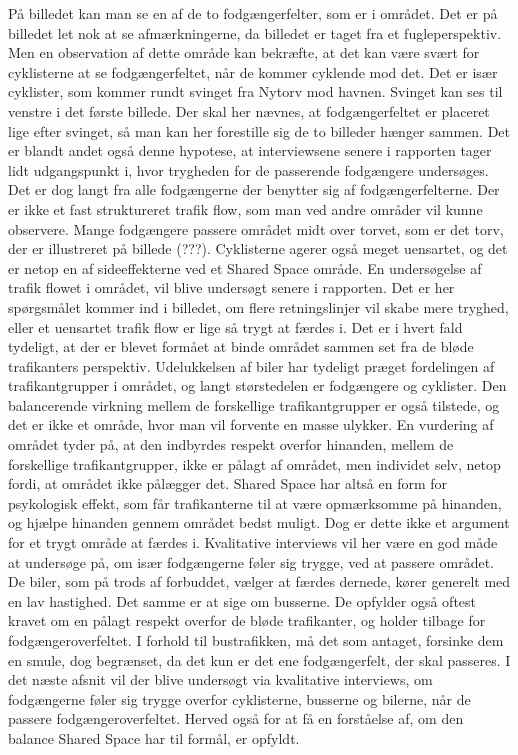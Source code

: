 På billedet kan man se en af de to fodgængerfelter, som er i området. Det er på billedet let nok at se afmærkningerne, da billedet er taget fra et fugleperspektiv. Men en observation af dette område kan bekræfte, at det kan være svært for cyklisterne at se fodgængerfeltet, når de kommer cyklende mod det. Det er især cyklister, som kommer rundt svinget fra Nytorv mod havnen. Svinget kan ses til venstre i det første billede. Der skal her nævnes, at fodgængerfeltet er placeret lige efter svinget, så man kan her forestille sig de to billeder hænger sammen. Det er blandt andet også denne hypotese, at interviewsene senere i rapporten tager lidt udgangspunkt i, hvor trygheden for de passerende fodgængere undersøges. 
Det er dog langt fra alle fodgængerne der benytter sig af fodgængerfelterne. Der er ikke et fast struktureret trafik flow, som man ved andre områder vil kunne observere. Mange fodgængere passere området midt over torvet, som er det torv, der er illustreret på billede (???). Cyklisterne agerer også meget uensartet, og det er netop en af sideeffekterne ved et Shared Space område. En undersøgelse af trafik flowet i området, vil blive undersøgt senere i rapporten. Det er her spørgsmålet kommer ind i billedet, om flere retningslinjer vil skabe mere tryghed, eller et uensartet trafik flow er lige så trygt at færdes i. Det er i hvert fald tydeligt, at der er blevet formået at binde området sammen set fra de bløde trafikanters perspektiv. Udelukkelsen af biler har tydeligt præget fordelingen af trafikantgrupper i området, og langt størstedelen er fodgængere og cyklister. Den balancerende virkning mellem de forskellige trafikantgrupper er også tilstede, og det er ikke et område, hvor man vil forvente en masse ulykker. En vurdering af området tyder på, at den indbyrdes respekt overfor hinanden, mellem de forskellige trafikantgrupper, ikke er pålagt af området, men individet selv, netop fordi, at området ikke pålægger det. Shared Space har altså en form for psykologisk effekt, som får trafikanterne til at være opmærksomme på hinanden, og hjælpe hinanden gennem området bedst muligt. Dog er dette ikke et argument for et trygt område at færdes i. Kvalitative interviews vil her være en god måde at undersøge på, om især fodgængerne føler sig trygge, ved at passere området.
De biler, som på trods af forbuddet, vælger at færdes dernede, kører generelt med en lav hastighed. Det samme er at sige om busserne. De opfylder også oftest kravet om en pålagt respekt overfor de bløde trafikanter, og holder tilbage for fodgængeroverfeltet. I forhold til bustrafikken, må det som antaget, forsinke dem en smule, dog begrænset, da det kun er det ene fodgængerfelt, der skal passeres. 
I det næste afsnit vil der blive undersøgt via kvalitative interviews, om fodgængerne føler sig trygge overfor cyklisterne, busserne og bilerne, når de passere fodgængeroverfeltet. Herved også for at få en forståelse af, om den balance Shared Space har til formål, er opfyldt.
